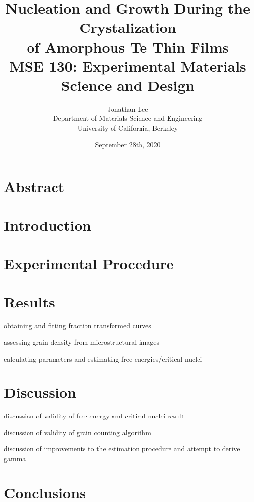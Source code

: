 \documentclass[12pt, titlepage]{article}
\title{\Large Nucleation and Growth During the Crystalization \\
		of Amorphous Te Thin Films \\
		\bigskip
	\normalsize MSE 130: Experimental Materials Science and Design}
\author{\normalsize Jonathan Lee \\
	\normalsize Department of Materials Science and Engineering \\
	\normalsize University of California, Berkeley}
\date{\normalsize September 28th, 2020}
\begin{document}
\maketitle

\doublespacing

\setcounter{page}{2}

\tableofcontents

\newpage

\section{Abstract}

\section{Introduction}



\section{Experimental Procedure}



\section{Results}

obtaining and fitting fraction transformed curves

assessing grain density from microstructural images

calculating parameters and estimating free energies/critical nuclei



\section{Discussion}

discussion of validity of free energy and critical nuclei result

discussion of validity of grain counting algorithm

discussion of improvements to the estimation procedure and attempt to derive gamma



\section{Conclusions}
\end{document}
